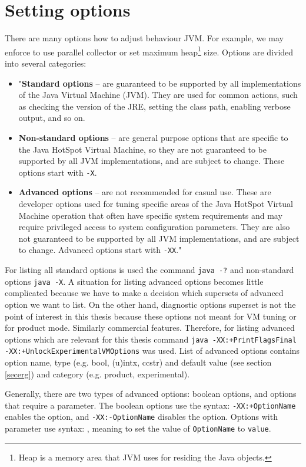 \documentclass[
  digital, %
  oneside,
  notable, %
  nolof,     %
  nolot     %
]{fithesis3}
\begin{document}
\section{Setting options}\label{secoptions}
There are many options how to adjust behaviour JVM. For example, we may enforce to use parallel collector or set maximum heap\footnote{Heap is a memory area that JVM uses for residing the Java objects.} size. Options are divided into several categories:
\begin{itemize}
	\item "\textbf{Standard options} -- are guaranteed to be supported by all implementations of the Java Virtual Machine (JVM). They are used for common actions, such as checking the version of the JRE, setting the class path, enabling verbose output, and so on.
	\item \textbf{Non-standard options} -- are general purpose options that are specific to the Java HotSpot Virtual Machine, so they are not guaranteed to be supported by all JVM implementations, and are subject to change. These options start with \texttt{-X}.
	\item \textbf{Advanced options} -- are not recommended for casual use. These are developer options used for tuning specific areas of the Java HotSpot Virtual Machine operation that often have specific system requirements and may require privileged access to system configuration parameters. They are also not guaranteed to be supported by all JVM implementations, and are subject to change. Advanced options start with \texttt{-XX}." \cite{java}
\end{itemize}
For listing all standard options is used the command \texttt{java -?} and non-standard options \texttt{java -X}. A situation for listing advanced options becomes little complicated because we have to make a decision which supersets of advanced option we want to list. On the other hand, diagnostic options superset is not the point of interest in this thesis because these options not meant for VM tuning or for product mode. Similarly commercial features. Therefore, for listing advanced options which are relevant for this thesis command \texttt{java -XX:+PrintFlagsFinal -XX:+UnlockExperimentalVMOptions} was used. List of advanced options contains option name, type (e.g. bool, (u)intx, ccstr) and default value (see section \ref{secerg}) and category (e.g. product, experimental).

Generally, there are two types of advanced options: boolean options, and options that require a parameter. The boolean options use the syntax: \texttt{-XX:+OptionName} enables the option, and \texttt{-XX:-OptionName} disables the option. Options with parameter use syntax: \texttt{}, meaning to set the value of \texttt{OptionName} to \texttt{value}. \cite{scott}
\end{document}
